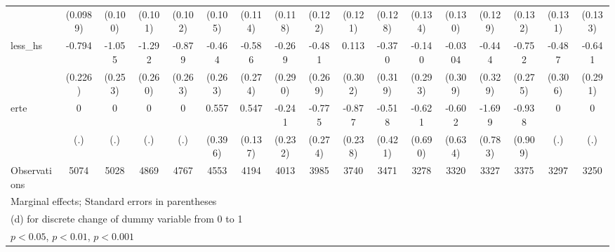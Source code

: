 {\begin{tabular}{l*{16}{c}}
                    &    (0.0989)         &     (0.100)         &     (0.101)         &     (0.102)         &     (0.105)         &     (0.114)         &     (0.118)         &     (0.122)         &     (0.121)         &     (0.128)         &     (0.134)         &     (0.130)         &     (0.129)         &     (0.132)         &     (0.131)         &     (0.133)         \\
[1em]
less\_hs             &      -0.794\sym{***}&      -1.055\sym{***}&      -1.292\sym{***}&      -0.879\sym{***}&      -0.464         &      -0.586\sym{*}  &      -0.269         &      -0.481         &       0.113         &      -0.370         &      -0.140         &     -0.0304         &      -0.444         &      -0.752\sym{**} &      -0.487         &      -0.641\sym{*}  \\
                    &     (0.226)         &     (0.253)         &     (0.260)         &     (0.263)         &     (0.263)         &     (0.274)         &     (0.290)         &     (0.269)         &     (0.302)         &     (0.319)         &     (0.293)         &     (0.309)         &     (0.329)         &     (0.275)         &     (0.306)         &     (0.291)         \\
[1em]
erte                &           0         &           0         &           0         &           0         &       0.557         &       0.547\sym{***}&      -0.241         &      -0.775\sym{**} &      -0.877\sym{***}&      -0.518         &      -0.621         &      -0.602         &      -1.699\sym{*}  &      -0.938         &           0         &           0         \\
                    &         (.)         &         (.)         &         (.)         &         (.)         &     (0.396)         &     (0.137)         &     (0.232)         &     (0.274)         &     (0.238)         &     (0.421)         &     (0.690)         &     (0.634)         &     (0.783)         &     (0.909)         &         (.)         &         (.)         \\
\hline
Observations        &        5074         &        5028         &        4869         &        4767         &        4553         &        4194         &        4013         &        3985         &        3740         &        3471         &        3278         &        3320         &        3327         &        3375         &        3297         &        3250         \\
\hline\hline
\multicolumn{17}{l}{\footnotesize Marginal effects; Standard errors in parentheses}\\
\multicolumn{17}{l}{\footnotesize  (d) for discrete change of dummy variable from 0 to 1}\\
\multicolumn{17}{l}{\footnotesize \sym{*} \(p<0.05\), \sym{**} \(p<0.01\), \sym{***} \(p<0.001\)}\\
\end{tabular}
}
